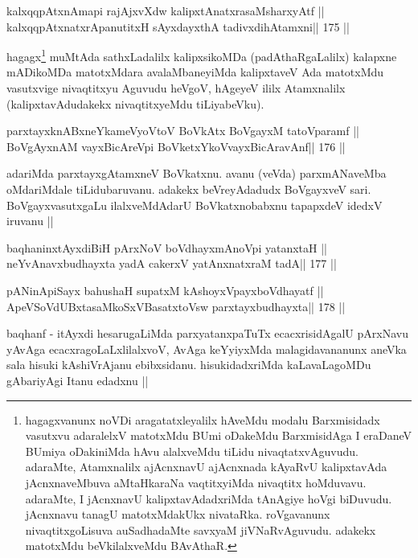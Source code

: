 
\begin{shl}
kalxqqpAtxnAmapi rajAjxvXdw kalipxtAnatxrasaMsharxyAtf ||
kalxqqpAtxnatxrApanutitxH sAyxdayxthA tadivxdihA\s\s tamxni\hfill || 175 ||
\end{shl}

\begin{artha}
hagagx\footnote[12]{hagagxvanunx noVDi aragatatxleyalilx hAveMdu modalu 
Barxmisidadx vasutxvu adaralelxV matotxMdu BUmi oDakeMdu BarxmisidAga I 
eraDaneV BUmiya oDakiniMda hAvu alalxveMdu tiLidu nivaqtatxvAguvudu. 
adaraMte, Atamxnalilx ajAcnxnavU ajAcnxnada kAyaRvU kalipxtavAda 
jAcnxnaveMbuva aMtaHkaraNa vaqtitxyiMda nivaqtitx hoMduvavu. adaraMte, 
I jAcnxnavU kalipxtavAdadxriMda tAnAgiye hoVgi biDuvudu. jAcnxnavu tanagU matotxMdakUkx nivataRka. roVgavanunx nivaqtitxgoLisuva auSadhadaMte savxyaM jiVNaRvAguvudu. adakekx matotxMdu beVkilalxveMdu BAvAthaR.} muMtAda sathxLadalilx kalipxsikoMDa (padAthaRgaLalilx) kalapxne mADikoMDa matotxMdara avalaMbaneyiMda kalipxtaveV Ada matotxMdu vasutxvige nivaqtitxyu Aguvudu heVgoV, hAgeyeV ililx Atamxnalilx (kalipxtavAdudakekx nivaqtitxyeMdu tiLiyabeVku).
\end{artha}

\begin{shl}
parxtayxknABxneYkameVyoV\s toV BoVkAtx BoVgayxM tatoV\s paramf ||
BoVgAyxnAM vayxBicAreV\s pi BoVketxYkoV\s vayxBicAravAnf\hfill || 176 ||
\end{shl}

\begin{artha}
adariMda parxtayxgAtamxneV BoVkatxnu. avanu (veVda) parxmANaveMba 
oMdariMdale tiLidubaruvanu. adakekx beVreyAdadudx BoVgayxveV sari. BoVgayxvasutxgaLu ilalxveMdAdarU BoVkatxnobabxnu tapapxdeV idedxV iruvanu ||
\end{artha}

\begin{shl}
baqhaninxtAyxdiBiH pArxNoV boVdhayxmAnoV\s pi yatanxtaH ||
neYvAnavxbudhayxta yadA cakerxV yatAnxnatxraM tadA\hfill || 177 ||
\end{shl}

\begin{shl}
pANinA\s\s piSayx bahushaH supatxM kAshoyxV\s payxboVdhayatf ||
ApeVSoVdUBxtasaMkoSxVBasatxtoV\s sw parxtayxbudhayxta\hfill || 178 ||
\end{shl}

\begin{artha}
baqhanf - itAyxdi hesarugaLiMda parxyatanxpaTuTx ecacxrisidAgalU 
pArxNavu yAvAga ecacxragoLaLxlilalxvoV, AvAga keYyiyxMda 
malagidavananunx aneVka sala hisuki kAshiVrAjanu ebibxsidanu. 
hisukidadxriMda kaLavaLagoMDu gAbariyAgi Itanu edadxnu ||
\end{artha}

